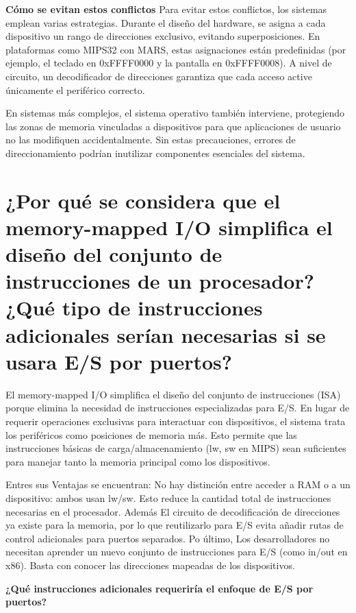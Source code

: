 \documentclass{article}
\begin{document}
\textbf{Cómo se evitan estos conflictos}\newline
Para evitar estos conflictos, los sistemas emplean varias estrategias. Durante el diseño del hardware, se asigna a cada dispositivo un rango de direcciones exclusivo, evitando superposiciones. En plataformas como MIPS32 con MARS, estas asignaciones están predefinidas (por ejemplo, el teclado en 0xFFFF0000 y la pantalla en 0xFFFF0008). A nivel de circuito, un decodificador de direcciones garantiza que cada acceso active únicamente el periférico correcto.\newline

En sistemas más complejos, el sistema operativo también interviene, protegiendo las zonas de memoria vinculadas a dispositivos para que aplicaciones de usuario no las modifiquen accidentalmente. Sin estas precauciones, errores de direccionamiento podrían inutilizar componentes esenciales del sistema.

\section{¿Por qué se considera que el memory-mapped I/O simplifica el diseño del conjunto de instrucciones de un procesador? ¿Qué tipo de instrucciones adicionales serían necesarias si se usara E/S por puertos? }

El memory-mapped I/O simplifica el diseño del conjunto de instrucciones (ISA) porque elimina la necesidad de instrucciones especializadas para E/S. En lugar de requerir operaciones exclusivas para interactuar con dispositivos, el sistema trata los periféricos como posiciones de memoria más. Esto permite que las instrucciones básicas de carga/almacenamiento (lw, sw en MIPS) sean suficientes para manejar tanto la memoria principal como los dispositivos.\newline

Entres sus Ventajas se encuentran: No hay distinción entre acceder a RAM o a un dispositivo: ambos usan lw/sw. Esto reduce la cantidad total de instrucciones necesarias en el procesador. Además El circuito de decodificación de direcciones ya existe para la memoria, por lo que reutilizarlo para E/S evita añadir rutas de control adicionales para puertos separados. Po último, Los desarrolladores no necesitan aprender un nuevo conjunto de instrucciones para E/S (como in/out en x86). Basta con conocer las direcciones mapeadas de los dispositivos.\newline

\textbf{¿Qué instrucciones adicionales requeriría el enfoque de E/S por puertos?}\newline
\end{document}
